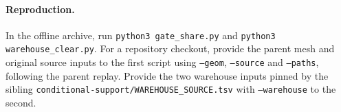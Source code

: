 \documentclass{article}
\begin{document}
\paragraph{Reproduction.}
In the offline archive, run \texttt{python3 gate\_share.py} and
\texttt{python3 warehouse\_clear.py}. For a repository checkout,
provide the parent mesh and original source inputs to the first script
using \texttt{--geom}, \texttt{--source} and \texttt{--paths},
following the parent replay. Provide the two warehouse inputs pinned
by the sibling \texttt{conditional-support/WAREHOUSE\_SOURCE.tsv}
with \texttt{--warehouse} to the second.
\end{document}
